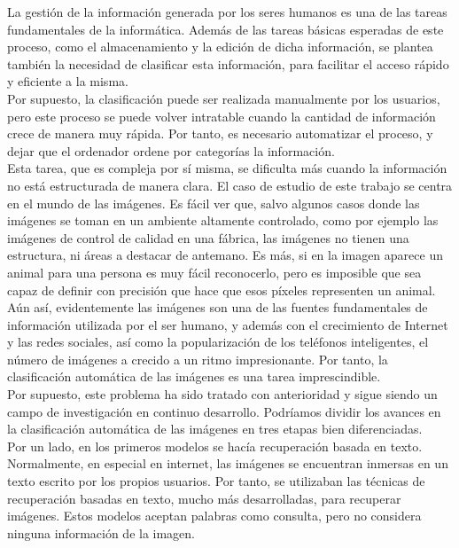 La gestión de la información generada por los seres humanos es una de las tareas fundamentales de la informática. Además de las tareas básicas esperadas de este proceso, como el almacenamiento y la edición de dicha información, se plantea también la necesidad de clasificar esta información, para facilitar el acceso rápido y eficiente a la misma.\\

Por supuesto, la clasificación puede ser realizada manualmente por los usuarios, pero este proceso se puede volver intratable cuando la cantidad de información crece de manera muy rápida. Por tanto, es necesario automatizar el proceso, y dejar que el ordenador ordene por categorías la información.\\

Esta tarea, que es compleja por sí misma, se dificulta más cuando la información no está estructurada de manera clara. El caso de estudio de este trabajo se centra en el mundo de las imágenes. Es fácil ver que, salvo algunos casos donde las imágenes se toman en un ambiente altamente controlado, como por ejemplo las imágenes de control de calidad en una fábrica, las imágenes no tienen una estructura, ni áreas a destacar de antemano. Es más, si en la imagen aparece un animal para una persona es muy fácil reconocerlo, pero es imposible que sea capaz de definir con precisión que hace que esos píxeles representen un animal.\\

Aún así, evidentemente las imágenes son una de las fuentes fundamentales de información utilizada por el ser humano, y además con el crecimiento de Internet y las redes sociales, así como la popularización de los teléfonos inteligentes, el número de imágenes a crecido a un ritmo impresionante. Por tanto, la clasificación automática de las imágenes es una tarea imprescindible.\\

Por supuesto, este problema ha sido tratado con anterioridad y sigue siendo un campo de investigación en continuo desarrollo. Podríamos dividir los avances en la clasificación automática de las imágenes en tres etapas bien diferenciadas.\\

Por un lado, en los primeros modelos se hacía recuperación basada en texto. Normalmente, en especial en internet, las imágenes se encuentran inmersas en un texto escrito por los propios usuarios. Por tanto, se utilizaban las técnicas de recuperación basadas en texto, mucho más desarrolladas, para recuperar imágenes. Estos modelos aceptan palabras como consulta, pero no considera ninguna información de la imagen.\\

